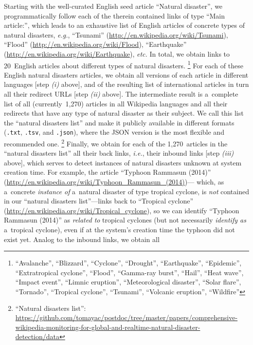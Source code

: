 \documentclass[runningheads,a4paper]{llncs}
\begin{document}
Starting with the well-curated English seed article ``Natural disaster'',
we programmatically follow each of the therein contained links of type ``Main article:'',
which leads to an exhaustive list of English articles
of concrete types of natural disasters,
\emph{e.g.}, ``Tsunami'' (\url{http://en.wikipedia.org/wiki/Tsunami}),
``Flood'' (\url{http://en.wikipedia.org/wiki/Flood}),
``Earthquake'' (\url{http://en.wikipedia.org/wiki/Earthquake}),
\emph{etc.} In total, we obtain links to 20~English articles
about different types of natural disasters.%
\footnote{``Avalanche'', ``Blizzard'', ``Cyclone'', ``Drought'', ``Earthquake'',
``Epidemic'', ``Extratropical cyclone'', ``Flood'', ``Gamma-ray burst'', ``Hail'',
``Heat wave'', ``Impact event'', ``Limnic eruption'', ``Meteorological disaster'',
``Solar flare'', ``Tornado'', ``Tropical cyclone'', ``Tsunami'',
``Volcanic eruption'', ``Wildfire''}
For each of these English natural disasters articles,
we obtain all versions of each article in different languages
[step \emph{(i)} above],
and of the resulting list of international articles
in turn all their redirect URLs [step \emph{(ii)} above].
The intermediate result is a~complete list of all (currently~1,270) articles
in all Wikipedia languages and all their redirects
that have any type of natural disaster as their subject.
We call this list the ``natural disasters list''
and make it publicly available in different formats
(\texttt{.txt}, \texttt{.tsv}, and \texttt{.json}), where the JSON version
is the most flexible and recommended one.%
\footnote{``Natural disasters list'':
\url{https://github.com/tomayac/postdoc/tree/master/papers/comprehensive-wikipedia-monitoring-for-global-and-realtime-natural-disaster-detection/data}}
Finally, we obtain for each of the 1,270~articles
in the ``natural disasters list''
all their back links, \emph{i.e.}, their inbound links
[step \emph{(iii)} above], which serves to detect
instances of natural disasters unknown at system creation time.
For example, the article ``Typhoon Rammasun (2014)''
(\url{http://en.wikipedia.org/wiki/Typhoon_Rammasun_(2014)})---%
which, as a~concrete \emph{instance of} a~natural disaster
of type tropical cyclone, is \emph{not} contained in our
``natural disasters list''---links back to ``Tropical cyclone''
(\url{http://en.wikipedia.org/wiki/Tropical_cyclone}),
so we can identify ``Typhoon Rammasun (2014)'' as \emph{related to}
tropical cyclones (but not necessarily \emph{identify as} a~tropical cyclone),
even if at the system's creation time the typhoon did not exist yet.
Analog to the inbound links, we obtain all
\end{document}
